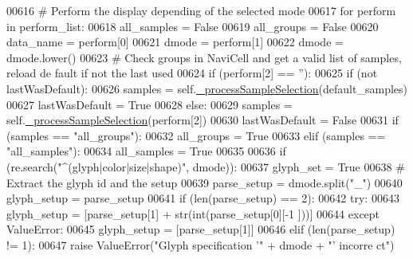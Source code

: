 \begin{DoxyCode}
00616         \textcolor{comment}{# Perform the display depending of the selected mode}
00617         \textcolor{keywordflow}{for} perform \textcolor{keywordflow}{in} perform\_list:
00618             all\_samples = \textcolor{keyword}{False}
00619             all\_groups = \textcolor{keyword}{False}
00620             data\_name = perform[0]
00621             dmode = perform[1]
00622             dmode = dmode.lower()
00623             \textcolor{comment}{# Check groups in NaviCell and get a valid list of samples, reload de
      fault if not the last used}
00624             \textcolor{keywordflow}{if} (perform[2] == \textcolor{stringliteral}{''}):
00625                 \textcolor{keywordflow}{if} (\textcolor{keywordflow}{not} lastWasDefault):
00626                     samples = self.\hyperlink{classnavicom_1_1navicom_1_1NaviCom_a2acd087f6c61dc8c7e1bc5a3391ff982}{_processSampleSelection}(default\_samples)
00627                     lastWasDefault = \textcolor{keyword}{True}
00628             \textcolor{keywordflow}{else}:
00629                 samples = self.\hyperlink{classnavicom_1_1navicom_1_1NaviCom_a2acd087f6c61dc8c7e1bc5a3391ff982}{_processSampleSelection}(perform[2])
00630                 lastWasDefault = \textcolor{keyword}{False}
00631             \textcolor{keywordflow}{if} (samples == \textcolor{stringliteral}{"all\_groups"}):
00632                 all\_groups = \textcolor{keyword}{True}
00633             \textcolor{keywordflow}{elif} (samples == \textcolor{stringliteral}{"all\_samples"}):
00634                 all\_samples = \textcolor{keyword}{True}
00635 
00636             \textcolor{keywordflow}{if} (re.search(\textcolor{stringliteral}{"^(glyph|color|size|shape)"}, dmode)):
00637                 glyph\_set = \textcolor{keyword}{True}
00638                 \textcolor{comment}{# Extract the glyph id and the setup}
00639                 parse\_setup = dmode.split(\textcolor{stringliteral}{"\_"})
00640                 glyph\_setup = parse\_setup
00641                 \textcolor{keywordflow}{if} (len(parse\_setup) == 2):
00642                     \textcolor{keywordflow}{try}:
00643                         glyph\_setup = [parse\_setup[1] + str(int(parse\_setup[0][-1
      ]))]
00644                     \textcolor{keywordflow}{except} ValueError:
00645                         glyph\_setup = [parse\_setup[1]]
00646                 \textcolor{keywordflow}{elif} (len(parse\_setup) != 1):
00647                     \textcolor{keywordflow}{raise} ValueError(\textcolor{stringliteral}{"Glyph specification '"} + dmode + \textcolor{stringliteral}{"' incorre
      ct"})

\end{DoxyCode}

